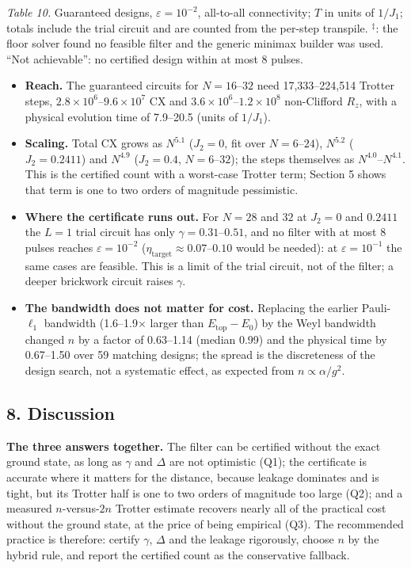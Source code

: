 \documentclass[
]{article}
\providecommand{\tightlist}{%
  \setlength{\itemsep}{0pt}\setlength{\parskip}{0pt}}
\begin{document}
\emph{Table 10.} Guaranteed designs, \(\varepsilon=10^{-2}\), all-to-all
connectivity; \(T\) in units of \(1/J_1\); totals include the trial
circuit and are counted from the per-step transpile. \(^\ddagger\): the
floor solver found no feasible filter and the generic minimax builder
was used. ``Not achievable'': no certified design within at most 8
pulses.

\begin{itemize}
\tightlist
\item
  \textbf{Reach.} The guaranteed circuits for \(N=16\)--\(32\) need
  17,333--224,514 Trotter steps,
  \(2.8\times10^{6}\)--\(9.6\times10^{7}\) CX and
  \(3.6\times10^{6}\)--\(1.2\times10^{8}\) non-Clifford \(R_z\), with a
  physical evolution time of 7.9--20.5 (units of \(1/J_1\)).
\item
  \textbf{Scaling.} Total CX grows as \(N^{5.1}\) (\(J_2=0\), fit over
  \(N=6\text{--}24\)), \(N^{5.2}\) (\(J_2=0.2411\)) and \(N^{4.9}\)
  (\(J_2=0.4\), \(N=6\text{--}32\)); the steps themselves as
  \(N^{4.0}\)--\(N^{4.1}\). This is the certified count with a
  worst-case Trotter term; Section 5 shows that term is one to two
  orders of magnitude pessimistic.
\item
  \textbf{Where the certificate runs out.} For \(N=28\) and \(32\) at
  \(J_2=0\) and \(0.2411\) the \(L=1\) trial circuit has only
  \(\gamma=0.31\)--\(0.51\), and no filter with at most 8 pulses reaches
  \(\varepsilon=10^{-2}\)
  (\(\eta_{\mathrm{target}}\approx0.07\)--\(0.10\) would be needed): at
  \(\varepsilon=10^{-1}\) the same cases are feasible. This is a limit
  of the trial circuit, not of the filter; a deeper brickwork circuit
  raises \(\gamma\).
\item
  \textbf{The bandwidth does not matter for cost.} Replacing the earlier
  Pauli-\(\ell_1\) bandwidth (1.6--1.9\(\times\) larger than
  \(E_{\mathrm{top}}-E_0\)) by the Weyl bandwidth changed \(n\) by a
  factor of 0.63--1.14 (median 0.99) and the physical time by 0.67--1.50
  over 59 matching designs; the spread is the discreteness of the design
  search, not a systematic effect, as expected from
  \(n\propto\alpha/g^2\).
\end{itemize}

\hypertarget{discussion}{%
\subsection{8. Discussion}\label{discussion}}

\textbf{The three answers together.} The filter can be certified without
the exact ground state, as long as \(\gamma\) and \(\Delta\) are not
optimistic (Q1); the certificate is accurate where it matters for the
distance, because leakage dominates and is tight, but its Trotter half
is one to two orders of magnitude too large (Q2); and a measured
\(n\)-versus-\(2n\) Trotter estimate recovers nearly all of the
practical cost without the ground state, at the price of being empirical
(Q3). The recommended practice is therefore: certify \(\gamma\),
\(\Delta\) and the leakage rigorously, choose \(n\) by the hybrid rule,
and report the certified count as the conservative fallback.
\end{document}
